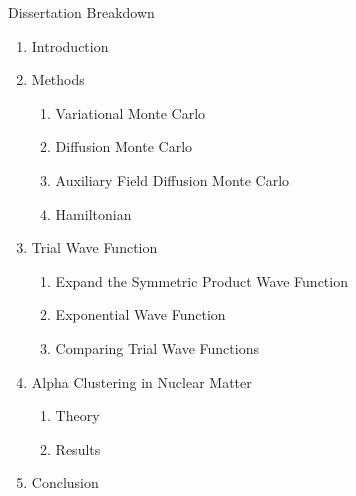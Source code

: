 \documentclass{beamer}
\begin{document}
\begin{frame}{Dissertation Breakdown}
\begin{enumerate}
   \item Introduction
   \item Methods
   \begin{enumerate}
      \item Variational Monte Carlo
      \item Diffusion Monte Carlo
      \item Auxiliary Field Diffusion Monte Carlo
      \item Hamiltonian
   \end{enumerate}
   \item Trial Wave Function
   \begin{enumerate}
      \item Expand the Symmetric Product Wave Function
      \item Exponential Wave Function
      \item Comparing Trial Wave Functions
   \end{enumerate}
   \item Alpha Clustering in Nuclear Matter
   \begin{enumerate}
      \item Theory
      \item Results
   \end{enumerate}
   \item Conclusion
\end{enumerate}
\end{frame}
\end{document}
